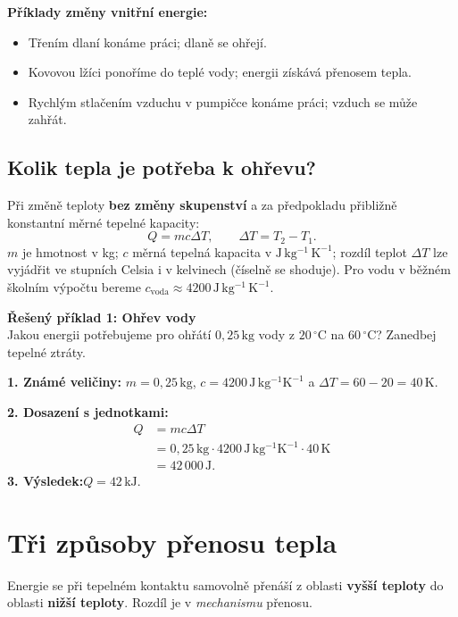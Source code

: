 \documentclass[11pt,a4paper]{article}
\newcommand{\unit}[1]{\,\mathrm{#1}}
\begin{document}
\textbf{Příklady změny vnitřní energie:}
\begin{itemize}
\item Třením dlaní konáme práci; dlaně se ohřejí.
\item Kovovou lžíci ponoříme do teplé vody; energii získává přenosem tepla.
\item Rychlým stlačením vzduchu v pumpičce konáme práci; vzduch se může zahřát.
\end{itemize}

\subsection{Kolik tepla je potřeba k ohřevu?}
\begin{theorybox}
Při změně teploty \textbf{bez změny skupenství} a za předpokladu přibližně konstantní měrné tepelné kapacity:
\[
\boxed{Q=mc\Delta T},\qquad \Delta T=T_2-T_1.
\]
$m$ je hmotnost v kg; $c$ měrná tepelná kapacita v $\mathrm{J\,kg^{-1}\,K^{-1}}$; rozdíl teplot $\Delta T$ lze vyjádřit ve stupních Celsia i v kelvinech (číselně se shoduje).
Pro vodu v běžném školním výpočtu bereme $c_{\mathrm{voda}}\approx 4200\unit{J\,kg^{-1}\,K^{-1}}$.
\end{theorybox}

\begin{solvedbox}
\textbf{Řešený příklad 1: Ohřev vody}\\
Jakou energii potřebujeme pro ohřátí $0{,}25\unit{kg}$ vody z $20\,^\circ\mathrm C$ na $60\,^\circ\mathrm C$? Zanedbej tepelné ztráty.

\textbf{1. Známé veličiny:} $m=0{,}25\unit{kg}$, $c=4200\unit{J\,kg^{-1}K^{-1}}$ a $\Delta T=60-20=40\unit{K}$.

\textbf{2. Dosazení s jednotkami:}
\begin{align*}
Q&=mc\Delta T\\
 &=0{,}25\unit{kg}\cdot4200\unit{J\,kg^{-1}K^{-1}}\cdot40\unit{K}\\
 &=42\,000\unit{J}.
\end{align*}
\textbf{3. Výsledek:}\quad $\boxed{Q=42\unit{kJ}}$.
\end{solvedbox}

\section{Tři způsoby přenosu tepla}
Energie se při tepelném kontaktu samovolně přenáší z oblasti \textbf{vyšší teploty} do oblasti \textbf{nižší teploty}. Rozdíl je v \emph{mechanismu} přenosu.
\end{document}

